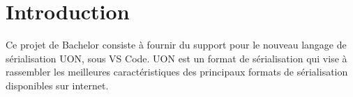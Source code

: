\documentclass[
    iict, %
    il, %
]{heig-tb}
\begin{document}
\maketitle
\frontmatter
\clearemptydoublepage

\preamble
\let\cleardoublepage\clearpage
\authentification
\let\cleardoublepage\clearpage

\begin{abstract}
    
\end{abstract}

\listoffigures
{}
\listoflistings
{}

\tableofcontents

\printnomenclature
\clearemptydoublepage
{}

\pagestyle{fancy}
\fancyhf{}
\renewcommand\headrulewidth{1pt}

\fancyhead[L]{\itshape\nouppercase{\leftmark}}

\renewcommand{\chaptermark}[1]{\markboth{\MakeUppercase{#1}}{}}

\renewcommand\footrulewidth{1pt}


\renewcommand{\headrulewidth}{0.4pt}
\renewcommand{\footrulewidth}{0.4pt}

\titlespacing*{\chapter}{0pt}{-40pt}{20pt}

\mainmatter
\chapter{Introduction}


Ce projet de Bachelor consiste à fournir du support pour le nouveau langage de sérialisation UON, sous VS Code.
UON est un format de sérialisation qui vise à rassembler les meilleures caractéristiques des principaux formats de sérialisation disponibles sur internet.
\end{document}
